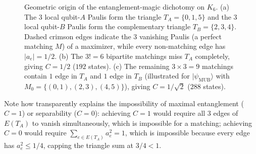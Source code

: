 \documentclass[11pt,a4paper]{article}
\theoremstyle{plain}
\theoremstyle{definition}
\theoremstyle{remark}
\newcommand{\ket}[1]{\lvert #1 \rangle}
\newcommand{\psimub}{\ket{\psi_{\mathrm{MUB}}}}
\begin{document}
\begin{figure}[htbp]
{%
  }
  \caption{Geometric origin of the entanglement-magic dichotomy on $K_6$. (a) The $3$ local qubit-$A$ Paulis form the triangle $T_A = \{0,1,5\}$ and the $3$ local qubit-$B$ Paulis form the complementary triangle $T_B = \{2,3,4\}$. Dashed crimson edges indicate the $3$ vanishing Paulis (a perfect matching $M$) of a maximizer, while every non-matching edge has $\lvert a_e\rvert = 1/2$. (b) The $3! = 6$ bipartite matchings miss $T_A$ completely, giving $C = 1/2$ ($192$ states). (c) The remaining $3\times 3 = 9$ matchings contain $1$ edge in $T_A$ and $1$ edge in $T_B$ (illustrated for $\psimub$ with $M_0 = \{(0,1),(2,3),(4,5)\}$), giving $C = 1/\sqrt{2}$ ($288$ states).}
  \label{fig:k6-concurrence}
\end{figure}

Note how transparently  explains the impossibility of maximal entanglement ($C = 1$) or separability ($C = 0$): achieving $C = 1$ would require all $3$ edges of $E(T_A)$ to vanish simultaneously, which is impossible for a matching; achieving $C = 0$ would require $\sum_{e\in E(T_A)} a_e^2 = 1$, which is impossible because every edge has $a_e^2 \le 1/4$, capping the triangle sum at $3/4 < 1$.
\end{document}
